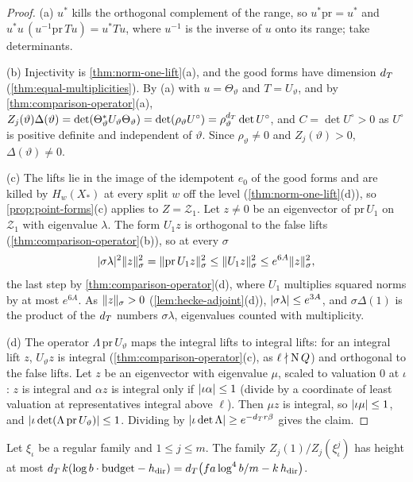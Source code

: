 \begin{proof}
(a) $u^*$ kills the orthogonal complement of the range, so $u^*\mathrm{pr}=u^*$ and $u^*u\,(u^{-1}\mathrm{pr}\,Tu)=u^*Tu$, where $u^{-1}$ is the inverse of $u$ onto its range; take determinants.

(b) Injectivity is \cref{thm:norm-one-lift}(a), and the good forms have dimension $d_T$ (\cref{thm:equal-multiplicities}). By (a) with $u=\Theta_\vartheta$ and $T=U_\vartheta$, and by \cref{thm:comparison-operator}(a),
$Z_j(\vartheta)\Delta(\vartheta)=\det(\Theta_\vartheta^*U_\vartheta\Theta_\vartheta)=\det(\rho_\vartheta U^\circ)=\rho_\vartheta^{d_T}\det U^\circ$, and $C=\det U^\circ>0$ as $U^\circ$ is positive definite and independent of $\vartheta$. Since $\rho_\vartheta\ne0$ and $Z_j(\vartheta)>0$, $\Delta(\vartheta)\ne0$.

(c) The lifts lie in the image of the idempotent $e_0$ of the good forms and are killed by $H_w(X_*)$ at every split $w$ off the level (\cref{thm:norm-one-lift}(d)), so \cref{prop:point-forms}(c) applies to $Z=\mathcal Z_1$. Let $z\ne0$ be an eigenvector
of $\mathrm{pr}\,U_1$ on $\mathcal Z_1$ with eigenvalue $\lambda$. The form $U_1z$ is orthogonal to the false lifts (\cref{thm:comparison-operator}(b)), so at every $\sigma$
\[
  \lvert \sigma\lambda\rvert^2\lVert z\rVert_\sigma^2=\lVert \mathrm{pr}\,U_1z\rVert_\sigma^2\le\lVert U_1z\rVert_\sigma^2\le e^{6A}\lVert z\rVert_\sigma^2,
\]
the last step by \cref{thm:comparison-operator}(d), where $U_1$ multiplies squared norms by at most $e^{6A}$. As $\lVert z\rVert_\sigma>0$ (\cref{lem:hecke-adjoint}(d)), $\lvert \sigma\lambda\rvert\le e^{3A}$, and $\sigma\Delta(1)$ is the product of the $d_T$ numbers $\sigma\lambda$, eigenvalues counted with
multiplicity.

(d) The operator $\Lambda\,\mathrm{pr}\,U_\vartheta$ maps the integral lifts to integral lifts: for an integral lift $z$, $U_\vartheta z$ is integral (\cref{thm:comparison-operator}(c), as $\ell\nmid\operatorname{N} Q$) and orthogonal to the false lifts. Let $z$ be an
eigenvector with eigenvalue $\mu$, scaled to valuation $0$ at $\iota$: $z$ is integral and $\alpha z$ is integral only if $\lvert \iota\alpha\rvert\le1$ (divide by a coordinate of least valuation at representatives integral above $\ell$). Then
$\mu z$ is integral, so $\lvert \iota\mu\rvert\le1$, and $\lvert \iota\det(\Lambda\,\mathrm{pr}\,U_\vartheta)\rvert\le1$. Dividing by $\lvert \iota\det\Lambda\rvert\ge e^{-d_T r\beta}$ gives the claim.
\end{proof}

\begin{theorem}\label{thm:cost-one-lift}
Let $\xi_\iota$ be a regular family and $1\le j\le m$. The family $Z_j(1)/Z_j(\xi^j_\iota)$ has height at most $d_T\,k(\log b\cdot\mathrm{budget}-h_{\mathrm{dir}})=d_T\bigl(fa\log^4b/m-k\,h_{\mathrm{dir}}\bigr)$.
\end{theorem}


